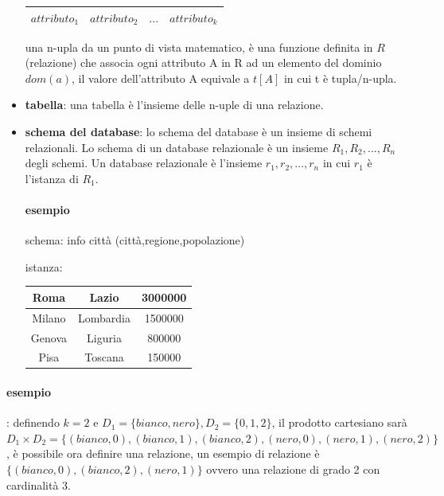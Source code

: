 \documentclass{article}
\begin{document}
\begin{itemize}
                \begin{tabular}{|c |c |c |c|}
                    \hline
                    $attributo_1$&$attributo_2$&$...$&$attributo_k$\\
                    \hline
                \end{tabular}
                
                una n-upla da un punto di vista matematico, è una funzione definita in $R$(relazione) che associa ogni attributo A in R ad un elemento del dominio $dom(a)$, il valore dell'attributo A equivale a $t[A]$ in cui t è tupla/n-upla.

            \item \textbf{tabella}:
                una tabella è l'insieme delle n-uple di una relazione.
            \item \textbf{schema del database}:
                lo schema del database è un insieme di schemi relazionali. Lo schema di un database relazionale è un insieme $R_1,R_2,...,R_n$ degli schemi. Un database relazionale è l'insieme $r_1,r_2,...,r_n$ in cui $r_1$ è l'istanza di $R_1$.
                
                \paragraph{esempio}
                    schema: info città (città,regione,popolazione)
                    
                    istanza:
                    \begin{tabular}{|c|c|c|}
                        \hline
                        Roma & Lazio & 3000000\\
                        \hline
                        Milano &Lombardia & 1500000\\
                        \hline
                        Genova & Liguria& 800000\\
                        \hline
                        Pisa & Toscana & 150000\\
                        \hline
                    \end{tabular}
            
            
        \end{itemize}

        \paragraph{esempio}:
            definendo $k=2$ e $D_1=\{bianco,nero\},D_2=\{0,1,2\}$, il prodotto cartesiano sarà $D_1\times D_2=\{(bianco,0),(bianco,1),(bianco,2),(nero,0),(nero,1),(nero,2)\}$, è possibile ora definire una relazione, un esempio di relazione è $\{(bianco,0),(bianco,2),(nero,1)\}$ ovvero una relazione di grado 2 con cardinalità 3.
\end{document}
